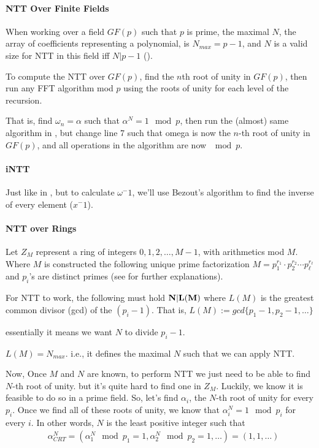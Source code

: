 \paragraph[NTT Over Finite Fields]{\bf NTT Over Finite Fields} \label{ntt-field}
When working over a field $GF(p)$ such that $p$ is prime,
the maximal $N$, the array of coefficients representing a
polynomial, is $N_{max}=p-1$, and $N$ is a valid size for NTT
 in this field iff $N|p-1$ (\cite[III. number theoretic transforms]{ntt}). 


To compute the NTT over $GF(p)$, find the $n$th root of unity in $GF(p)$,
 then run any FFT algorithm mod $p$ using the roots
of unity for each level of the recursion.

That is, find $\omega_n=\alpha$ such that $\alpha^N=1 \mod p$, 
then run the (almost) same algorithm in , 
but change line 7 such that omega is now the $n$-th root of unity in $GF(p)$, and
all operations in the algorithm are now $\mod p$.

\paragraph{\bf iNTT}
Just like in , but to calculate $\omega^-1$, we'll
use Bezout's algorithm to find the inverse of every element ($x^-1$).



\paragraph[short]{\bf NTT over Rings}
Let $Z_M$ represent a ring of integers ${0,1,2,\dots , M-1}$,
with arithmetics mod $M$.
Where $M$ is constructed the following unique prime factorization
$M=p_{1}^{r_1}\cdot  p_{2}^{r_2} \cdots p_{\ell}^{r_\ell}$
and $p_i$'s are distinct primes (see \cite[NTT sec. III][]{ntt}
 for further explanations).

For NTT to work, the following must hold $\bf N|L(M)$
where $L(M)$ is the greatest common
divisor (gcd) of the $(p_{i}-1)$. That is, 
$L(M):= gcd\{p_1-1,p_2-1,\dots\}$

essentially it means we want $ N$ to divide $p_i-1$.

\begin{corollary}
  $L(M)=N_{max}$. i.e., it defines the maximal $N$ 
  such that we can apply NTT.  
\end{corollary}

Now, Once $M$ and $N$ are known, to perform NTT we just need to be able to find 
$N$-th root of unity. but it's quite hard to find one in $Z_M$.
Luckily, we know it is feasible to do so in a prime field. 
So, let's find $\alpha_i$, the $N$-th root of unity for every $p_i$.
Once we find all of these roots of unity, we know that $\alpha_i^N=1 \mod p_i$ for every $i$.
In other words, $N$ is the least positive integer such that
\begin{align*}
  &\alpha_{CRT}^N = (\alpha_1^N \mod p_1=1, \alpha_2^N \mod p_2=1,\dots)= (1,1,\dots)
\end{align*}

